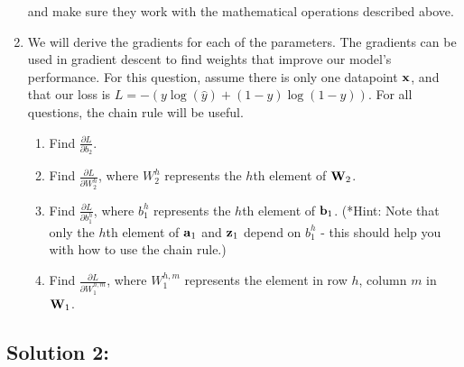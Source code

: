 \documentclass[submit]{harvardml}
\begin{document}
\begin{problem}
\begin{enumerate}
      and make sure they work with the mathematical operations described above.
      
    \item  We will derive the gradients for each of the parameters.  The gradients can be used in gradient descent to find weights that improve our model's performance. For this question, assume there is only one datapoint $\bold{x}$, and that our loss is $L = -(y \log (\hat{y}) + (1 - y) \log (1 - \hat{y}))$. For all questions, the chain rule will be useful.
    \begin{enumerate}
        \item Find $\frac{\partial L}{\partial b_2}$. 
        
        \item Find $\frac{\partial L}{\partial W_2^h}$, where $W_2^h$ represents the $h$th element of $\bold{W}_2$.
        
        \item Find $\frac{\partial L}{\partial b_1^h}$, where $b_1^h$ represents the $h$th element of $\bold{b}_1$. (*Hint: Note that only the $h$th element of $\bold{a}_1$ and $\bold{z}_1$ depend on $b_1^h$ - this should help you with how to use the chain rule.)
        
        \item Find $\frac{\partial L}{\partial W_1^{h,m}}$, where  $W_1^{h,m}$ represents the element in row $h$, column $m$ in $\bold{W}_1$.
    
    \end{enumerate}
    \end{enumerate}
    
    \end{problem}

\newpage
\subsection*{Solution 2:}
\end{document}
